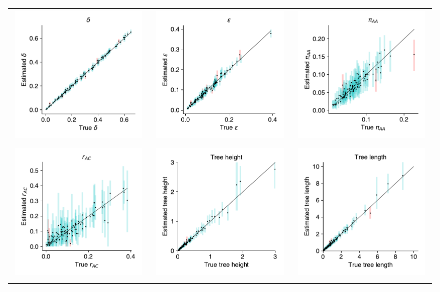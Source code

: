 \documentclass{standalone}
\begin{document}
\begin{figure}
\renewcommand{\figurename}{}
\renewcommand{\thefigure}{}
   \centering
   \begin{tabular}{ccc}
    \includegraphics[width=4cm]{gt16_EM_delta.pdf} &
    \includegraphics[width=4cm]{gt16_EM_epsilon.pdf} &
    \includegraphics[width=4cm]{gt16_EM_pi_0.pdf} \\
    \includegraphics[width=4cm]{gt16_EM_rates_ac.pdf} &
    \includegraphics[width=4cm]{gt16_EM_treeheight.pdf} &
    \includegraphics[width=4cm]{gt16_EM_treelength.pdf}
   \end{tabular}
\end{figure}
\end{document}
